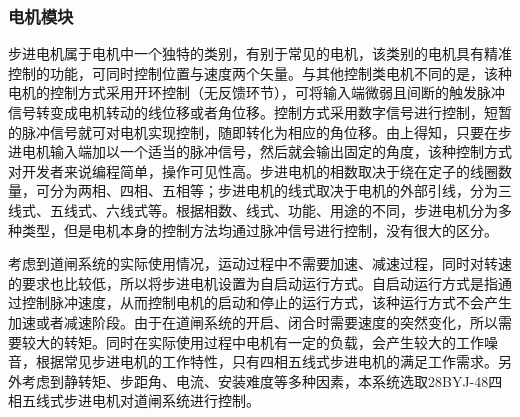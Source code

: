 \subsubsection{电机模块}
步进电机属于电机中一个独特的类别，有别于常见的电机，该类别的电机具有精准控制的功能，可同时控制位置与速度两个矢量。与其他控制类电机不同的是，该种电机的控制方式采用开环控制（无反馈环节），可将输入端微弱且间断的触发脉冲信号转变成电机转动的线位移或者角位移。控制方式采用数字信号进行控制，短暂的脉冲信号就可对电机实现控制，随即转化为相应的角位移。由上得知，只要在步进电机输入端加以一个适当的脉冲信号，然后就会输出固定的角度，该种控制方式对开发者来说编程简单，操作可见性高。步进电机的相数取决于绕在定子的线圈数量，可分为两相、四相、五相等；步进电机的线式取决于电机的外部引线，分为三线式、五线式、六线式等。根据相数、线式、功能、用途的不同，步进电机分为多种类型，但是电机本身的控制方法均通过脉冲信号进行控制，没有很大的区分。

考虑到道闸系统的实际使用情况，运动过程中不需要加速、减速过程，同时对转速的要求也比较低，所以将步进电机设置为自启动运行方式。自启动运行方式是指通过控制脉冲速度，从而控制电机的启动和停止的运行方式，该种运行方式不会产生加速或者减速阶段。由于在道闸系统的开启、闭合时需要速度的突然变化，所以需要较大的转矩。同时在实际使用过程中电机有一定的负载，会产生较大的工作噪音，根据常见步进电机的工作特性，只有四相五线式步进电机的满足工作需求。另外考虑到静转矩、步距角、电流、安装难度等多种因素，本系统选取28BYJ-48四相五线式步进电机对道闸系统进行控制。